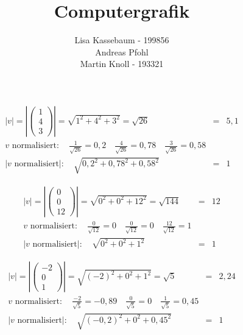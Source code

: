 \documentclass[a4paper]{article}
\title{Computergrafik}
\author{Lisa Kassebaum - 199856 \\ Andreas Pfohl \\ Martin Knoll - 193321 }
\date{}
\begin{document}
\maketitle
\section{}
\subsection{}
  \begin{align*}
    \left|v\right|
    =
    \left|
    \begin{pmatrix}
      1 \\ 4 \\ 3
    \end{pmatrix}
    \right|
    =
    \sqrt{1^2 + 4^2 + 3^2}
    = \sqrt{26} &=& 5,1
    \\[1em]
    v\text{ normalisiert}: \quad \frac{1}{\sqrt{26}} = 0,2 \quad \frac{4}{\sqrt{26}} = 0,78 \quad \frac{3}{\sqrt{26}} = 0,58
    \\[1em]
    \left|v\text{ normalisiert}\right|: \quad \sqrt{0,2^2 + 0,78^2 + 0,58^2} &=& 1
  \end{align*}

  \begin{align*}
    \left|v\right|
    =
    \left|
    \begin{pmatrix}
      0 \\ 0 \\ 12
    \end{pmatrix}
    \right|
    =
    \sqrt{0^2 + 0^2 + 12^2}
    = \sqrt{144} &=& 12
    \\[1em]
    v\text{ normalisiert}: \quad \frac{0}{\sqrt{12}} = 0 \quad \frac{0}{\sqrt{12}} = 0 \quad \frac{12}{\sqrt{12}} = 1
    \\[1em]
    \left|v\text{ normalisiert}\right|: \quad \sqrt{0^2 + 0^2 + 1^2} &=& 1
  \end{align*}

  \begin{align*}
    \left|v\right|
    =
    \left|
    \begin{pmatrix}
      -2 \\ 0 \\ 1
    \end{pmatrix}
    \right|
    =
    \sqrt{(-2)^2 + 0^2 + 1^2}
    = \sqrt{5} &=& 2,24
    \\[1em]
    v\text{ normalisiert}: \quad \frac{-2}{\sqrt{5}} = -0,89 \quad \frac{0}{\sqrt{5}} = 0 \quad \frac{1}{\sqrt{5}} = 0,45
    \\[1em]
    \left|v\text{ normalisiert}\right|: \quad \sqrt{(-0,2)^2 + 0^2 + 0,45^2} &=& 1
  \end{align*}
\end{document}
